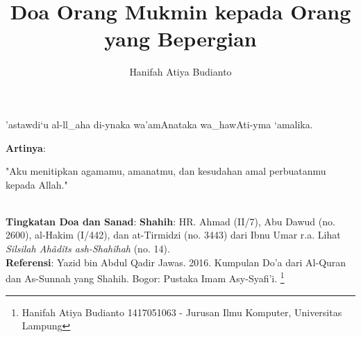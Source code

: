 \documentclass[a4paper,12pt]{article}
\title{\Large Doa Orang Mukmin kepada Orang yang Bepergian}
\author{\calligra Hanifah Atiya Budianto}
\begin{document}
\sffamily
\maketitle 
\fullvocalize
{}
\begin{arabtext}
\noindent
'astawdi`u al-ll_aha di-ynaka wa'amAnataka wa_hawAti-yma `amalika.\\
\end{arabtext}
\noindent
\textbf{Artinya}:
\par
\indent
"Aku menitipkan agamamu, amanatmu, dan kesudahan amal perbuatanmu kepada 
Allah."\\\\
\par
\noindent
\textbf{Tingkatan Doa dan Sanad}: \textbf{Shahih}: HR. Ahmad (II/7), Abu 
Dawud (no. 2600), al-Hakim (I/442), dan at-Tirmidzi (no. 3443) dari Ibnu 
Umar r.a. Lihat \textit{Silsilah Ah\^{a}d\^{i}ts ash-Shah\^{i}hah} (no. 
14).\\
\textbf{Referensi}: Yazid bin Abdul Qadir Jawas. 2016. Kumpulan Do'a dari
Al-Quran dan As-Sunnah yang Shahih. Bogor: Pustaka Imam Asy-Syafi'i.
\footnote{Hanifah Atiya Budianto 1417051063 - Jurusan Ilmu Komputer,
Universitas Lampung}
\end{document}
